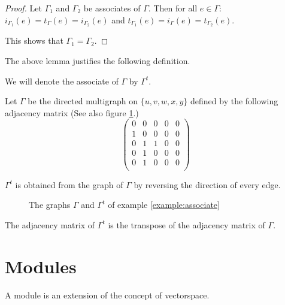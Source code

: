 \begin{proof}
	Let $\Gamma_{1}$ and $\Gamma_{2}$ be associates of $\Gamma$. Then for
	all $e\in\Gamma$: $i_{\Gamma_{1}}(e) = t_{\Gamma}(e) =
	i_{\Gamma_{2}}(e)$ and $t_{\Gamma_{1}}(e) = i_{\Gamma}(e) =
	t_{\Gamma_{2}}(e)$.
	
	This shows that $\Gamma_{1} = \Gamma_{2}$.
\end{proof}

The above lemma justifies the following definition.

\begin{definition}
	We will denote the associate of $\Gamma$ by $\Gamma^{t}$.
\end{definition}

\begin{example}\label{example:associate}
	Let $\Gamma$ be the directed multigraph on $\{u,v,w,x,y\}$ defined by
	the following adjacency matrix (See also figure \ref{figure:associate}.)
	\[
		\left(
		\begin{array}{ccccc}
			0 & 0 & 0 & 0 & 0 \\
			1 & 0 & 0 & 0 & 0 \\
			0 & 1 & 1 & 0 & 0 \\
			0 & 1 & 0 & 0 & 0 \\
			0 & 1 & 0 & 0 & 0 \\
		\end{array}
		\right)
	\]
	
	$\Gamma^{t}$ is obtained from the graph of $\Gamma$ by reversing the
	direction of every edge.
	\begin{figure}
		\begin{center}
			\hfill
			\hfill
			\hspace*{\fill}
		\end{center}
		\caption{The graphs $\Gamma$ and $\Gamma^{t}$ of example
		\ref{example:associate}}\label{figure:associate}
	\end{figure}
	The adjacency matrix of $\Gamma^{t}$ is the transpose of the adjacency
	matrix of $\Gamma$.
\end{example}

\section{Modules}

A module is an extension of the concept of vectorspace.


